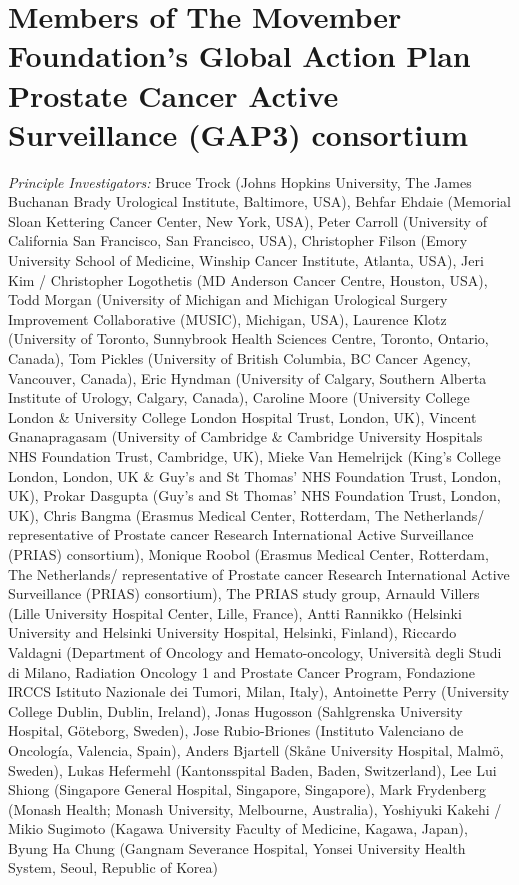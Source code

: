 \section*{Members of The Movember Foundation’s Global Action Plan Prostate Cancer Active Surveillance (GAP3) consortium}

\emph{Principle Investigators:} Bruce Trock (Johns Hopkins University, The James Buchanan Brady Urological Institute, Baltimore, USA), Behfar Ehdaie (Memorial Sloan Kettering Cancer Center, New York, USA), Peter Carroll (University of California San Francisco, San Francisco, USA), Christopher Filson (Emory University School of Medicine, Winship Cancer Institute, Atlanta, USA), Jeri Kim / Christopher Logothetis (MD Anderson Cancer Centre, Houston, USA), Todd Morgan (University of Michigan and Michigan Urological Surgery Improvement Collaborative (MUSIC), Michigan, USA), Laurence Klotz (University of Toronto, Sunnybrook Health Sciences Centre, Toronto, Ontario, Canada), Tom Pickles (University of British Columbia, BC Cancer Agency, Vancouver, Canada), Eric Hyndman (University of Calgary, Southern Alberta Institute of Urology, Calgary, Canada), Caroline Moore (University College London \& University College London Hospital Trust, London, UK), Vincent Gnanapragasam (University of Cambridge \& Cambridge University Hospitals NHS Foundation Trust, Cambridge, UK), Mieke Van Hemelrijck (King's College London, London, UK \& Guy’s and St Thomas’ NHS Foundation Trust, London, UK), Prokar Dasgupta (Guy’s and St Thomas’ NHS Foundation Trust, London, UK), Chris Bangma (Erasmus Medical Center, Rotterdam, The Netherlands/ representative of Prostate cancer Research International Active Surveillance (PRIAS) consortium), Monique Roobol (Erasmus Medical Center, Rotterdam, The Netherlands/ representative of Prostate cancer Research International Active Surveillance (PRIAS) consortium), The PRIAS study group, Arnauld Villers (Lille University Hospital Center, Lille, France), Antti Rannikko (Helsinki University and Helsinki University Hospital, Helsinki, Finland), Riccardo Valdagni (Department of Oncology and Hemato-oncology, Università degli Studi di Milano, Radiation Oncology 1 and Prostate Cancer Program, Fondazione IRCCS Istituto Nazionale dei Tumori, Milan, Italy), Antoinette Perry (University College Dublin, Dublin, Ireland), Jonas Hugosson (Sahlgrenska University Hospital, Göteborg, Sweden), Jose Rubio-Briones (Instituto Valenciano de Oncología, Valencia, Spain), Anders Bjartell (Skåne University Hospital, Malmö, Sweden), Lukas Hefermehl (Kantonsspital Baden, Baden, Switzerland), Lee Lui Shiong (Singapore General Hospital, Singapore, Singapore), Mark Frydenberg (Monash Health; Monash University, Melbourne, Australia), Yoshiyuki Kakehi / Mikio Sugimoto (Kagawa University Faculty of Medicine, Kagawa, Japan), Byung Ha Chung (Gangnam Severance Hospital, Yonsei University Health System, Seoul, Republic of Korea)

